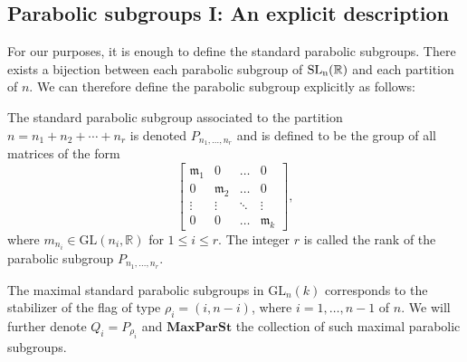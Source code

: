 \subsection{Parabolic subgroups I: An explicit description }
For our purposes, it is enough to define the standard parabolic subgroups.  There exists a bijection between each parabolic subgroup of $\operatorname{\text{SL}_n(\mathbb{R})}$
and each partition of $n$. We can therefore define the parabolic subgroup explicitly as follows:
\begin{definition}
    The standard parabolic subgroup associated to the partition $n = n_1 + n_2 + \cdots + n_r$ is denoted $P_{n_1,\ldots,n_r}$ and is defined to be the group of all matrices of the form
    \[
        \begin{bmatrix}
            \mathfrak{m}_1 & 0              & \ldots & 0              \\
            0              & \mathfrak{m}_2 & \ldots & 0              \\
            \vdots         & \vdots         & \ddots & \vdots         \\
            0              & 0              & \ldots & \mathfrak{m}_k
        \end{bmatrix} ,
    \]
    where $m_{n_i} \in \mathrm{GL}(n_i, \mathbb{R})$ for $1 \leq i \leq r$. The integer $r$ is called the rank of the parabolic subgroup $P_{n_1,\ldots,n_r}$.
\end{definition}

\begin{definition}
    The maximal standard parabolic subgroups in $\text{GL}_n(k)$ corresponds to the
    stabilizer of the flag of type $\rho_i =(i,n-i)$, where $i = 1,\ldots,n-1$ of $n$. We will
    further denote $Q_i = P_{\rho_i}$ and $\textbf{MaxParSt}$ the collection of such maximal parabolic subgroups.
\end{definition}

